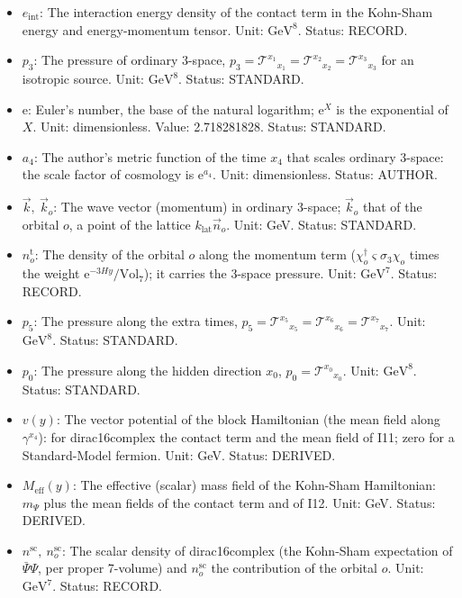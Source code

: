 \documentclass[
  10pt,
]{article}
\begin{document}
\begin{itemize}
  density of the Standard-Model fermion \(\psi_i\) (per proper 7-volume
  of eight dimensions); \(n_f\) the density of the fermion component
  \(f\) and \(n_i\) that of the neutrino mass state \(i\) (per 3-volume
  of four dimensions). Unit: \(\mathrm{GeV}^{7}\) (eight dimensions),
  \(\mathrm{GeV}^{3}\) (four dimensions). Status: STANDARD.
\item
  \(e_{\mathrm{int}}\): The interaction energy density of the contact
  term in the Kohn-Sham energy and energy-momentum tensor. Unit:
  \(\mathrm{GeV}^{8}\). Status: RECORD.
\item
  \(p_3\): The pressure of ordinary 3-space,
  \(p_3 = \mathcal{T}^{x_1}{}_{x_1} = \mathcal{T}^{x_2}{}_{x_2} = \mathcal{T}^{x_3}{}_{x_3}\)
  for an isotropic source. Unit: \(\mathrm{GeV}^{8}\). Status: STANDARD.
\item
  \(\mathrm{e}\): Euler's number, the base of the natural logarithm;
  \(\mathrm{e}^{X}\) is the exponential of \(X\). Unit: dimensionless.
  Value: 2.718281828. Status: STANDARD.
\item
  \(a_4\): The author's metric function of the time \(x_4\) that scales
  ordinary 3-space: the scale factor of cosmology is
  \(\mathrm{e}^{a_4}\). Unit: dimensionless. Status: AUTHOR.
\item
  \(\vec k,\ \vec k_o\): The wave vector (momentum) in ordinary 3-space;
  \(\vec k_o\) that of the orbital \(o\), a point of the lattice
  \(k_{\mathrm{lat}}\vec n_o\). Unit: GeV. Status: STANDARD.
\item
  \(n^{\mathrm{t}}_o\): The density of the orbital \(o\) along the
  momentum term (\(\chi_o^\dagger\varsigma\sigma_3\chi_o\) times the
  weight \(\mathrm{e}^{-3Hy}/\mathrm{Vol}_7\)); it carries the 3-space
  pressure. Unit: \(\mathrm{GeV}^{7}\). Status: RECORD.
\item
  \(p_5\): The pressure along the extra times,
  \(p_5 = \mathcal{T}^{x_5}{}_{x_5} = \mathcal{T}^{x_6}{}_{x_6} = \mathcal{T}^{x_7}{}_{x_7}\).
  Unit: \(\mathrm{GeV}^{8}\). Status: STANDARD.
\item
  \(p_0\): The pressure along the hidden direction \(x_0\),
  \(p_0 = \mathcal{T}^{x_0}{}_{x_0}\). Unit: \(\mathrm{GeV}^{8}\).
  Status: STANDARD.
\item
  \(v(y)\): The vector potential of the block Hamiltonian (the mean
  field along \(\gamma^{x_4}\)): for dirac16complex the contact term and
  the mean field of I11; zero for a Standard-Model fermion. Unit: GeV.
  Status: DERIVED.
\item
  \(M_{\mathrm{eff}}(y)\): The effective (scalar) mass field of the
  Kohn-Sham Hamiltonian: \(m_\Psi\) plus the mean fields of the contact
  term and of I12. Unit: GeV. Status: DERIVED.
\item
  \(n^{\mathrm{sc}},\ n^{\mathrm{sc}}_o\): The scalar density of
  dirac16complex (the Kohn-Sham expectation of \(\bar\Psi\Psi\), per
  proper 7-volume) and \(n^{\mathrm{sc}}_o\) the contribution of the
  orbital \(o\). Unit: \(\mathrm{GeV}^{7}\). Status: RECORD.
\end{itemize}
\end{document}

